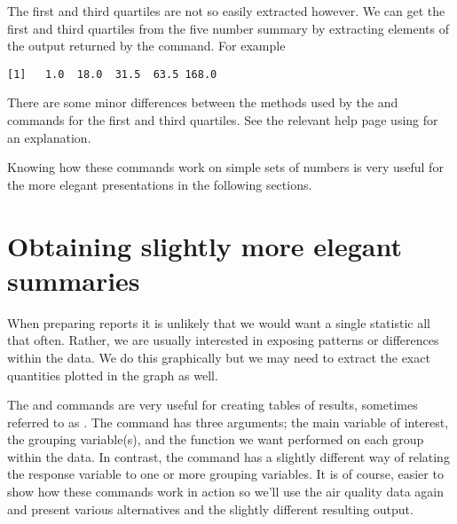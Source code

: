 The first and third quartiles are not so easily extracted however. We can get the first and third quartiles from the five number summary by extracting elements of the output returned by the  command. For example 
\begin{knitrout}
\color{fgcolor}\begin{kframe}
\begin{alltt}
\hlstd{> }
\end{alltt}
\begin{verbatim}
[1]   1.0  18.0  31.5  63.5 168.0
\end{verbatim}
\end{kframe}
\end{knitrout}
There are some minor differences between the methods used by the  and  commands for the first and third quartiles. See the relevant help page using  for an explanation. 
 
Knowing how these commands work on simple sets of numbers is very useful for the more elegant presentations in the following sections. 
 
\section{Obtaining slightly more elegant summaries} 
 
When preparing reports it is unlikely that we would want a single statistic all that often. Rather, we are usually interested in exposing patterns or differences within the data. We do this graphically but we may need to extract the exact quantities plotted in the graph as well. 
 
The  and  commands are very useful for creating tables of results, sometimes referred to as . The  command has three arguments; the main variable of interest, the grouping variable(s), and the function we want performed on each group within the data. In contrast, the  command has a slightly different way of relating the response variable to one or more grouping variables. It is of course, easier to show how these commands work in action so we'll use the air quality data again and present various alternatives and the slightly different resulting output. 
 
